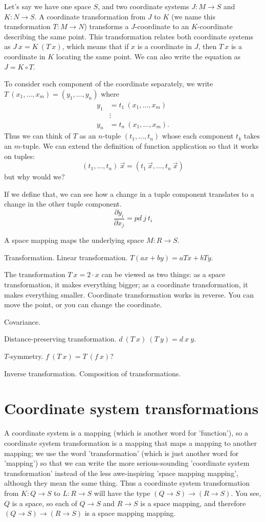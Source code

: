 Let's say we have one space $S$,
and two coordinate systems $J : M \to S$ and $K : N \to S$.
A coordinate transformation from $J$ to $K$ (we name this transformation $T : M \to N$)
transforms a $J$-coordinate
to an $K$-coordinate describing the same point.
This transformation relates both coordinate systems as
$J~x = K~(T~x)$, which means that if $x$ is a coordinate in $J$, then $T~x$ is a coordinate in $K$ locating the same point.
We can also write the equation as $J = K \circ T$.

To consider each component of the coordinate separately,
we write
$T~(x_1,\ldots,x_m) = (y_1,\ldots,y_n)$
where
\begin{align*}
y_1 &= t_1~(x_1,\ldots,x_m)
\\ &\vdots
\\ y_n &= t_n~(x_1,\ldots,x_m).
\end{align*}
Thus we can think of $T$ as an $n$-tuple $(t_1,\ldots,t_n)$
whose each component $t_k$ takes an $m$-tuple.
We can extend the definition of function application so that it works on tuples:
\[
(t_1,\ldots,t_n)~\vec{x} = (t_1~\vec{x}, \ldots, t_n~\vec{x})
\]
but why would we?

If we define that, we can see how a change in a tuple component translates
to a change in the other tuple component.
\[
\frac{\partial y_i}{\partial x_j} = pd~j~t_i
\]

A space mapping maps the underlying space $M : R \to S$.

Transformation.
Linear transformation.
$T(ax+by) = aTx + bTy$.

The transformation $T~x = 2\cdot x$ can be viewed as two things:
as a space transformation, it makes everything bigger;
as a coordinate transformation, it makes everything smaller.
Coordinate transformation works in reverse.
You can move the point, or you can change the coordinate.

Covariance.

Distance-preserving transformation.
$d~(T~x)~(T~y) = d~x~y$.

$T$-symmetry.
$f~(T~x) = T~(f~x)$?

Inverse transformation.
Composition of transformations.

\section{Coordinate system transformations}

A coordinate system is a mapping (which is another word for 'function'),
so a coordinate system transformation is a mapping that maps a mapping to another mapping;
we use the word 'transformation' (which is just another word for 'mapping') so that
we can write the more serious-sounding 'coordinate system transformation'
instead of the less awe-inspiring 'space mapping mapping',
although they mean the same thing.
Thus a coordinate system transformation
from $K : Q \to S$ to $L : R \to S$ will have the type
$(Q \to S) \to (R \to S)$.
You see, $Q$ is a space,
so each of $Q \to S$ and $R \to S$ is a space mapping,
and therefore $(Q \to S) \to (R \to S)$ is a space mapping mapping.

